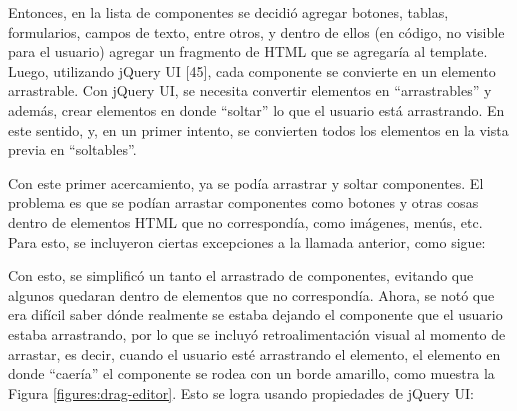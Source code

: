 \documentclass[12pt,spanish,letter]{report}
\newenvironment{Shaded}{}{}
\newcommand{\KeywordTok}[1]{\textcolor[rgb]{0.00,0.44,0.13}{\textbf{{#1}}}}
\newcommand{\StringTok}[1]{\textcolor[rgb]{0.25,0.44,0.63}{{#1}}}
\newcommand{\CommentTok}[1]{\textcolor[rgb]{0.38,0.63,0.69}{\textit{{#1}}}}
\newcommand{\NormalTok}[1]{{#1}}
\begin{document}
Entonces, en la lista de componentes se decidió agregar botones, tablas,
formularios, campos de texto, entre otros, y dentro de ellos (en código,
no visible para el usuario) agregar un fragmento de HTML que se
agregaría al template. Luego, utilizando jQuery UI {[}45{]}, cada
componente se convierte en un elemento arrastrable. Con jQuery UI, se
necesita convertir elementos en ``arrastrables'' y además, crear
elementos en donde ``soltar'' lo que el usuario está arrastrando. En
este sentido, y, en un primer intento, se convierten todos los elementos
en la vista previa en ``soltables''.

\begin{Shaded}
\end{Shaded}

Con este primer acercamiento, ya se podía arrastrar y soltar
componentes. El problema es que se podían arrastar componentes como
botones y otras cosas dentro de elementos HTML que no correspondía, como
imágenes, menús, etc. Para esto, se incluyeron ciertas excepciones a la
llamada anterior, como sigue:

\begin{Shaded}
\end{Shaded}

Con esto, se simplificó un tanto el arrastrado de componentes, evitando
que algunos quedaran dentro de elementos que no correspondía. Ahora, se
notó que era difícil saber dónde realmente se estaba dejando el
componente que el usuario estaba arrastrando, por lo que se incluyó
retroalimentación visual al momento de arrastar, es decir, cuando el
usuario esté arrastrando el elemento, el elemento en donde ``caería'' el
componente se rodea con un borde amarillo, como muestra la Figura
\ref{figures:drag-editor}. Esto se logra usando propiedades de jQuery
UI:
\end{document}
